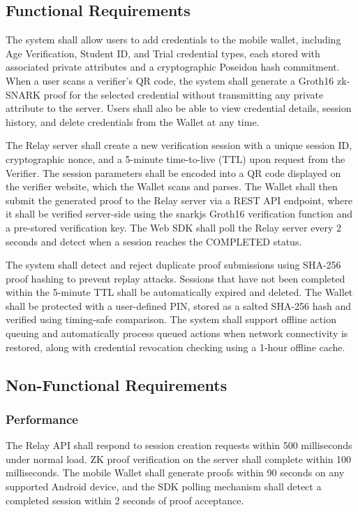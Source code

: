 \subsection{Functional Requirements}

The system shall allow users to add credentials to the mobile wallet, including Age Verification, Student ID, and Trial credential types, each stored with associated private attributes and a cryptographic Poseidon hash commitment. When a user scans a verifier's QR code, the system shall generate a Groth16 zk-SNARK proof for the selected credential without transmitting any private attribute to the server. Users shall also be able to view credential details, session history, and delete credentials from the Wallet at any time.

The Relay server shall create a new verification session with a unique session ID, cryptographic nonce, and a 5-minute time-to-live (TTL) upon request from the Verifier. The session parameters shall be encoded into a QR code displayed on the verifier website, which the Wallet scans and parses. The Wallet shall then submit the generated proof to the Relay server via a REST API endpoint, where it shall be verified server-side using the snarkjs Groth16 verification function and a pre-stored verification key. The Web SDK shall poll the Relay server every 2 seconds and detect when a session reaches the COMPLETED status.

The system shall detect and reject duplicate proof submissions using SHA-256 proof hashing to prevent replay attacks. Sessions that have not been completed within the 5-minute TTL shall be automatically expired and deleted. The Wallet shall be protected with a user-defined PIN, stored as a salted SHA-256 hash and verified using timing-safe comparison. The system shall support offline action queuing and automatically process queued actions when network connectivity is restored, along with credential revocation checking using a 1-hour offline cache.

\subsection{Non-Functional Requirements}

\subsubsection{Performance}
The Relay API shall respond to session creation requests within 500 milliseconds under normal load. ZK proof verification on the server shall complete within 100 milliseconds. The mobile Wallet shall generate proofs within 90 seconds on any supported Android device, and the SDK polling mechanism shall detect a completed session within 2 seconds of proof acceptance.

